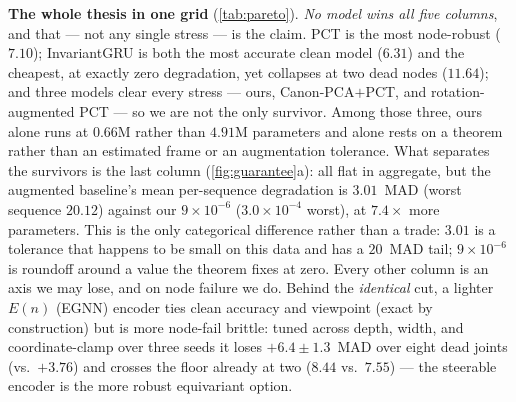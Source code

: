 \documentclass[10pt,twocolumn,letterpaper]{article}
\begin{document}
\textbf{The whole thesis in one grid} (\cref{tab:pareto}). \emph{No model wins all five columns}, and
that --- not any single stress --- is the claim. PCT is the most node-robust ($7.10$); InvariantGRU is
both the most accurate clean model ($6.31$) and the cheapest, at exactly zero degradation, yet collapses at
two dead nodes ($11.64$); and three models clear every stress --- ours, Canon-PCA$+$PCT, and
rotation-augmented PCT --- so we are not the only survivor. Among those three, ours alone runs at
$0.66$M rather than $4.91$M parameters and alone rests on a theorem rather than an estimated frame or
an augmentation tolerance. What separates the survivors is the last column (\cref{fig:guarantee}a):
all flat in aggregate, but the augmented baseline's mean per-sequence degradation is $3.01$~MAD (worst
sequence $20.12$) against our $9\times10^{-6}$ ($3.0\times10^{-4}$ worst), at $7.4\times$ more
parameters. This is the only categorical difference rather than a trade: $3.01$ is a tolerance that
happens to be small on this data and has a $20$~MAD tail; $9\times10^{-6}$ is roundoff around a value
the theorem fixes at zero. Every other column is an axis we may lose, and on node failure we do.
Behind the \emph{identical} cut, a lighter $E(n)$ (EGNN) encoder ties clean accuracy and viewpoint
(exact by construction) but is more node-fail brittle: tuned across depth, width, and coordinate-clamp
over three seeds it loses $+6.4\pm1.3$~MAD over eight dead joints (vs.\ $+3.76$) and crosses the floor
already at two ($8.44$ vs.\ $7.55$) --- the steerable encoder is the more robust equivariant option.
\end{document}
